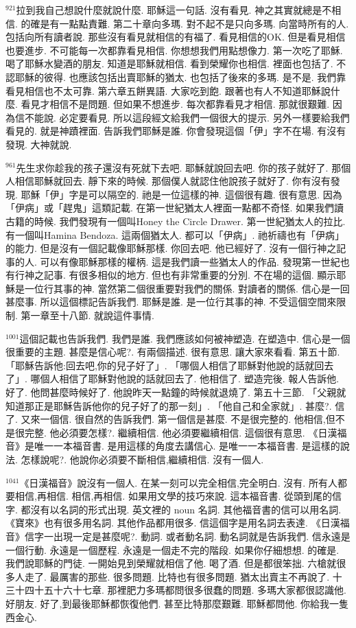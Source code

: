 \documentclass{book}
\begin{document}
$^{921}$拉到我自己想說什麼就說什麼.
耶穌這一句話.
沒有看見.
神之其實就總是不相信.
的確是有一點點責難.
第二十章向多瑪.
對不起不是只向多瑪.
向當時所有的人.
包括向所有讀者說.
那些沒有看見就相信的有福了.
看見相信的OK.
但是看見相信也要進步.
不可能每一次都靠看見相信.
你想想我們用點想像力.
第一次吃了耶穌.
喝了耶穌水變酒的朋友.
知道是耶穌就相信.
看到榮耀你也相信.
裡面也包括了.
不認耶穌的彼得.
也應該包括出賣耶穌的猶太.
也包括了後來的多瑪.
是不是.
我們靠看見相信也不太可靠.
第六章五餅異語.
大家吃到飽.
跟著也有人不知道耶穌說什麼.
看見才相信不是問題.
但如果不想進步.
每次都靠看見才相信.
那就很艱難.
因為信不能說.
必定要看見.
所以這段經文給我們一個很大的提示.
另外一樣要給我們看見的.
就是神蹟裡面.
告訴我們耶穌是誰.
你會發現這個「伊」字不在場.
有沒有發現.
大神就說.

$^{961}$先生求你趁我的孩子還沒有死就下去吧.
耶穌就說回去吧.
你的孩子就好了.
那個人相信耶穌就回去.
靜下來的時候.
那個僕人就認住他說孩子就好了.
你有沒有發現.
耶穌「伊」字是可以隔空的.
祂是一位這樣的神.
這個很有趣.
很有意思.
因為「伊病」或「趕鬼」這類記載.
在第一世紀猶太人裡面一點都不奇怪.
如果我們讀古籍的時候.
我們發現有一個叫Honey the Circle Drawer.
第一世紀猶太人的拉比.
有一個叫Hamina Bendoza.
這兩個猶太人.
都可以「伊病」.
祂祈禱也有「伊病」的能力.
但是沒有一個記載像耶穌那樣.
你回去吧.
他已經好了.
沒有一個行神之記事的人.
可以有像耶穌那樣的權柄.
這是我們讀一些猶太人的作品.
發現第一世紀也有行神之記事.
有很多相似的地方.
但也有非常重要的分別.
不在場的這個.
顯示耶穌是一位行其事的神.
當然第二個很重要對我們的關係.
對讀者的關係.
信心是一回甚麼事.
所以這個標記告訴我們.
耶穌是誰.
是一位行其事的神.
不受這個空間來限制.
第一章至十八節.
就說這件事情.

$^{1001}$這個記載也告訴我們.
我們是誰.
我們應該如何被神塑造.
在塑造中.
信心是一個很重要的主題.
甚麼是信心呢?.
有兩個描述.
很有意思.
讓大家來看看.
第五十節.
「耶穌告訴他:回去吧,你的兒子好了」.
「哪個人相信了耶穌對他說的話就回去了」.
哪個人相信了耶穌對他說的話就回去了.
他相信了.
塑造完後.
報人告訴他.
好了.
他問甚麼時候好了.
他說昨天一點鐘的時候就退燒了.
第五十三節.
「父親就知道那正是耶穌告訴他你的兒子好了的那一刻」.
「他自己和全家就」.
甚麼?.
信了.
又來一個信.
很自然的告訴我們.
第一個信是甚麼.
不是很完整的.
他相信,但不是很完整.
他必須要怎樣?.
繼續相信.
他必須要繼續相信.
這個很有意思.
《日漢福音》是唯一一本福音書.
是用這樣的角度去講信心.
是唯一一本福音書.
是這樣的說法.
怎樣說呢?.
他說你必須要不斷相信,繼續相信.
沒有一個人.

$^{1041}$《日漢福音》說沒有一個人.
在某一刻可以完全相信,完全明白.
沒有.
所有人都要相信,再相信.
相信,再相信.
如果用文學的技巧來說.
這本福音書.
從頭到尾的信字.
都沒有以名詞的形式出現.
英文裡的 noun 名詞.
其他福音書的信可以用名詞.
《寶來》也有很多用名詞.
其他作品都用很多.
信這個字是用名詞去表達.
《日漢福音》信字一出現一定是甚麼呢?.
動詞.
或者動名詞.
動名詞就是告訴我們.
信永遠是一個行動.
永遠是一個歷程.
永遠是一個走不完的階段.
如果你仔細想想.
的確是.
我們說耶穌的門徒.
一開始見到榮耀就相信了他.
喝了酒.
但是都很笨拙.
六槍就很多人走了.
最厲害的那些.
很多問題.
比特也有很多問題.
猶太出賣主不再說了.
十三十四十五十六十七章.
那裡肥力多瑪都問很多很蠢的問題.
多瑪大家都很認識他.
好朋友.
好了,到最後耶穌都恢復他們.
甚至比特那麼艱難.
耶穌都問他.
你給我一隻西金心.
\end{document}
